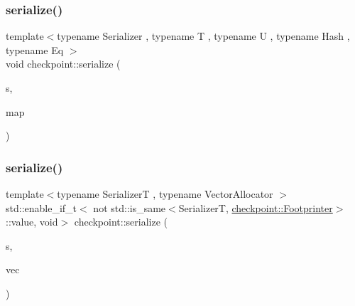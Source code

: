 \mbox{\label{namespacecheckpoint_aa77eeb7a036d253ef33ed2c9ef764a5e}} 
\subsubsection{\texorpdfstring{serialize()}{serialize()}\hspace{0.1cm}{\footnotesize\ttfamily [24/29]}}
{\footnotesize\ttfamily template$<$typename Serializer , typename T , typename U , typename Hash , typename Eq $>$ \\
void checkpoint\+::serialize (\begin{DoxyParamCaption}\item[{\hyperlink{structcheckpoint_1_1_serializer}{Serializer} \&}]{s,  }\item[{std\+::unordered\+\_\+multimap$<$ T, U, Hash, Eq $>$ \&}]{map }\end{DoxyParamCaption})\hspace{0.3cm}{\ttfamily [inline]}}

\mbox{\label{namespacecheckpoint_a4dbdef848c92782b54888f6247f8e8ba}} 
\subsubsection{\texorpdfstring{serialize()}{serialize()}\hspace{0.1cm}{\footnotesize\ttfamily [25/29]}}
{\footnotesize\ttfamily template$<$typename SerializerT , typename Vector\+Allocator $>$ \\
std\+::enable\+\_\+if\+\_\+t$<$ not std\+::is\+\_\+same$<$SerializerT, \hyperlink{structcheckpoint_1_1_footprinter}{checkpoint\+::\+Footprinter}$>$\+::value, void$>$ checkpoint\+::serialize (\begin{DoxyParamCaption}\item[{SerializerT \&}]{s,  }\item[{std\+::vector$<$ bool, Vector\+Allocator $>$ \&}]{vec }\end{DoxyParamCaption})}

\mbox{\label{namespacecheckpoint_ae4ca8cbc6daf2f5a2a20d44d9fe1cc9f}} 
